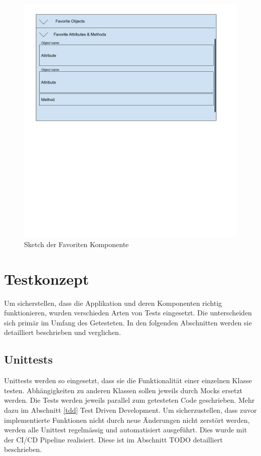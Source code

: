 \begin{figure}
   \centering
   \includegraphics[width=1.0\textwidth]{gfx/Favorites Sketch.png}
   \caption{
      Sketch der Favoriten Komponente
      }
      \label{fig:favoritesSketch}
\end{figure}

\pagebreak
\section{Testkonzept}
Um sicherstellen, dass die Applikation und deren Komponenten richtig funktionieren, wurden verschieden Arten von Tests eingesetzt.
Die unterscheiden sich primär im Umfang des Getesteten. 
In den folgenden Abschnitten werden sie detailliert beschrieben und verglichen.

\subsection{Unittests}
Unittests werden so eingesetzt, dass sie die Funktionalität einer einzelnen Klasse testen.
Abhängigkeiten zu anderen Klassen sollen jeweils durch Mocks ersetzt werden.
Die Tests werden jeweils parallel zum getesteten Code geschrieben.
Mehr dazu im Abschnitt \ref{tdd} Test Driven Development.
Um sicherzustellen, dass zuvor implementierte Funktionen nicht durch neue Änderungen nicht zerstört werden, werden alle Unittest regelmässig und automatisiert ausgeführt.
Dies wurde mit der CI/CD Pipeline realisiert. Diese ist im Abschnitt TODO detailliert beschrieben.

